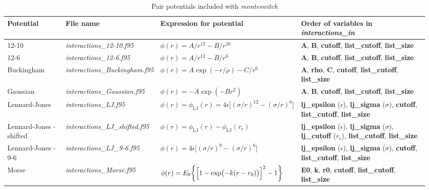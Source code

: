\documentclass{report}
\begin{document}
\begin{landscape}
\begin{center}\label{table:pair_potentials}
\begin{longtable}{ l l l p{5cm} }
\caption{Pair potentials included with \emph{monteswitch}}
\\
Potential & File name & Expression for potential & Order of variables in \emph{interactions\_in}  \\

\hline

12-10 & \emph{interactions\_12-10.f95} & $\phi(r)=A/r^{12}-B/r^{10}$ 
& \textbf{A}, \textbf{B}, \textbf{cutoff}, \textbf{list\_cutoff}, \textbf{list\_size} \\

12-6  &  \emph{interactions\_12-6.f95} & $\phi(r)=A/r^{12}-B/r^{6}$ 
& \textbf{A}, \textbf{B}, \textbf{cutoff}, \textbf{list\_cutoff}, \textbf{list\_size} \\

Buckingham & \emph{interactions\_Buckingham.f95} & $\phi(r)=A\exp(-r/\rho)-C/r^6$ 
& \textbf{A}, \textbf{rho}, \textbf{C}, \textbf{cutoff}, \textbf{list\_cutoff}, \textbf{list\_size} \\

Gaussian & \emph{interactions\_Gaussian.f95} & $\phi(r)=-A\exp(-Br^2)$ 
& \textbf{A}, \textbf{B}, \textbf{cutoff}, \textbf{list\_cutoff}, \textbf{list\_size} \\

Lennard-Jones & \emph{interactions\_LJ.f95} & $\phi(r)=\phi_{\text{LJ}}(r)=4\epsilon\bigl[(\sigma/r)^{12}-(\sigma/r)^6\bigr]$
& \textbf{lj\_epsilon} ($\epsilon$), \textbf{lj\_sigma} ($\sigma$), \textbf{cutoff}, \textbf{list\_cutoff}, \textbf{list\_size} \\

Lennard-Jones - shifted  & \emph{interactions\_LJ\_shifted.f95} & $\phi(r)=\phi_{\text{LJ}}(r)-\phi_{\text{LJ}}(r_{\text{c}})$ 
& \textbf{lj\_epsilon} ($\epsilon$), \textbf{lj\_sigma} ($\sigma$), \textbf{lj\_cutoff} ($r_{\text{c}}$), \textbf{list\_cutoff}, \textbf{list\_size} \\

Lennard-Jones - 9-6 & \emph{interactions\_LJ\_9-6.f95} & $\phi(r)=4\epsilon\bigl[(\sigma/r)^9-(\sigma/r)^6\bigr]$
& \textbf{lj\_epsilon} ($\epsilon$), \textbf{lj\_sigma} ($\sigma$), \textbf{cutoff}, \textbf{list\_cutoff}, \textbf{list\_size} \\

Morse & \emph{interactions\_Morse.f95} & $\phi(r)=E_0\bigg\lbrace \Bigl[1-\exp\bigl(-k(r-r_0)\bigr)\Bigr]^2 -1 \biggr\rbrace$ 
& \textbf{E0}, \textbf{k}, \textbf{r0}, \textbf{cutoff}, \textbf{list\_cutoff}, \textbf{list\_size} \\


\end{longtable}
\end{center}
\end{landscape}
\end{document}
